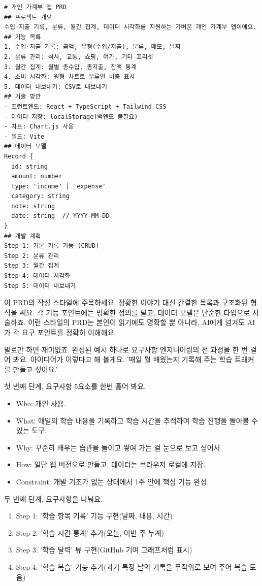 \begin{lstlisting}
# 개인 가계부 앱 PRD
## 프로젝트 개요
수입·지출 기록, 분류, 월간 집계, 데이터 시각화를 지원하는 가벼운 개인 가계부 앱이에요.
## 기능 목록
1. 수입·지출 기록: 금액, 유형(수입/지출), 분류, 메모, 날짜
2. 분류 관리: 식사, 교통, 쇼핑, 여가, 기타 프리셋
3. 월간 집계: 월별 총수입, 총지출, 잔액 통계
4. 소비 시각화: 원형 차트로 분류별 비중 표시
5. 데이터 내보내기: CSV로 내보내기
## 기술 방안
- 프런트엔드: React + TypeScript + Tailwind CSS
- 데이터 저장: localStorage(백엔드 불필요)
- 차트: Chart.js 사용
- 빌드: Vite
## 데이터 모델
Record {
  id: string
  amount: number
  type: 'income' | 'expense'
  category: string
  note: string
  date: string  // YYYY-MM-DD
}
## 개발 계획
Step 1: 기본 기록 기능 (CRUD)
Step 2: 분류 관리
Step 3: 월간 집계
Step 4: 데이터 시각화
Step 5: 데이터 내보내기
\end{lstlisting}

이 PRD의 작성 스타일에 주목하세요. 장황한 이야기 대신 간결한 목록과 구조화된 형식을 써요. 각 기능 포인트에는 명확한 정의를 달고, 데이터 모델은 단순한 타입으로 서술하죠. 이런 스타일의 PRD는 본인이 읽기에도 명확할 뿐 아니라, AI에게 넘겨도 AI가 각 요구 포인트를 정확히 이해해요.


말로만 하면 재미없죠. 완성된 예시 하나로 요구사항 엔지니어링의 전 과정을 한 번 걸어 봐요. 아이디어가 이렇다고 해 볼게요. '매일 뭘 배웠는지 기록해 주는 학습 트래커를 만들고 싶어요.'

첫 번째 단계, 요구사항 5요소를 한번 훑어 봐요.

\begin{itemize}
  \item Who: 개인 사용.
  \item What: 매일의 학습 내용을 기록하고 학습 시간을 추적하며 학습 진행을 돌아볼 수 있는 도구.
  \item Why: 꾸준히 배우는 습관을 들이고 쌓여 가는 걸 눈으로 보고 싶어서.
  \item How: 일단 웹 버전으로 만들고, 데이터는 브라우저 로컬에 저장.
  \item Constraint: 개발 기초가 없는 상태에서 1주 안에 핵심 기능 완성.
\end{itemize}

두 번째 단계, 요구사항을 나눠요.

\begin{enumerate}
  \item Step 1: '학습 항목 기록' 기능 구현(날짜, 내용, 시간)
  \item Step 2: '학습 시간 통계' 추가(오늘, 이번 주 누계)
  \item Step 3: '학습 달력' 뷰 구현(GitHub 기여 그래프처럼 표시)
  \item Step 4: '학습 복습' 기능 추가(과거 특정 날의 기록을 무작위로 보여 주어 복습 도움)
\end{enumerate}

